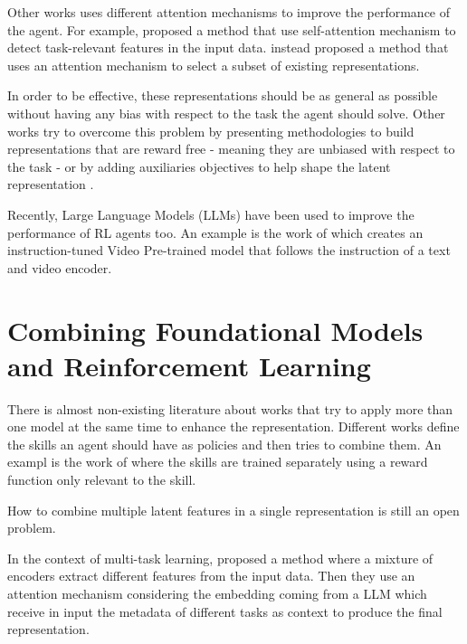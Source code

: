 Other works uses different attention mechanisms to improve the performance of the agent.
For example, \citet{bramlage2022generalized} proposed a method that use self-attention mechanism to detect task-relevant features in the input data.
\citet{blakeman2022selective} instead proposed a method that uses an attention mechanism to select a subset of existing representations.

In order to be effective, these representations should be as general as possible without having any bias with respect to the task the agent should solve.
Other works try to overcome this problem by presenting methodologies to build representations that are reward free - meaning they are unbiased with respect to the task \citep{stooke2021decoupling} - or by adding auxiliaries objectives to help shape the latent representation \citep{lan2023bootstrapped}.

Recently, Large Language Models (LLMs) have been used to improve the performance of RL agents too.
An example is the work of \citet{lifshitz2024steve} which creates an instruction-tuned Video Pre-trained model that follows the instruction of a text and video encoder.





\section{Combining Foundational Models and Reinforcement Learning}\label{sec:fm_rl_combination}
There is almost non-existing literature about works that try to apply more than one model at the same time to enhance the representation.
Different works define the skills an agent should have as policies and then tries to combine them.
An exampl is the work of \citet{sahni2017learning} where the skills are trained separately using a reward function only relevant to the skill.


How to combine multiple latent features in a single representation is still an open problem.




In the context of multi-task learning, \citet{sodhani2021multi} proposed a method where a mixture of encoders extract different features from the input data.
Then they use an attention mechanism considering the embedding coming from a LLM which receive in input the metadata of different tasks as context to produce the final representation.







